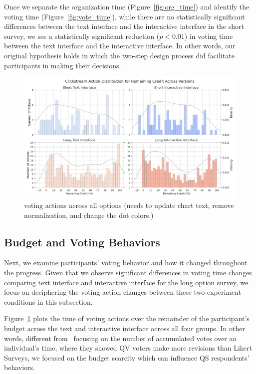 Once we separate the organization time (Figure~\ref{fig:org_time}) and identify the voting time (Figure~\ref{fig:vote_time}), while there are no statistically significant differences between the text interface and the interactive interface in the short survey, we see a statistically significant reduction ($p<0.01$) in voting time between the text interface and the interactive interface. In other words, our original hypothesis holds in which the two-step design process did facilitate participants in making their decisions.

\begin{figure}[ht]
    \centering
    \includegraphics[width=\textwidth]{content/image/results/clickstream_action_distribution.pdf}
    \caption{voting actions across all options (needs to update chart text, remove normalization, and change the dot colors.)}
    \label{fig:voting_all}
\end{figure}

\subsection{Budget and Voting Behaviors}
Next, we examine participants' voting behavior and how it changed throughout the progress. Given that we observe significant differences in voting time changes comparing text interface and interactive interface for the long option survey, we focus on deciphering the voting action changes between these two experiment conditions in this subsection.

Figure~\ref{fig:voting_all} plots the time of voting actions over the remainder of the participant's budget across the text and interactive interface across all four groups. In other words, different from~\textcite{quarfoot2017quadratic} focusing on the number of accumulated votes over an individual's time, where they showed QV voters make more revisions than Likert Surveys, we focused on the budget scarcity which can influence QS respondents' behaviors.

